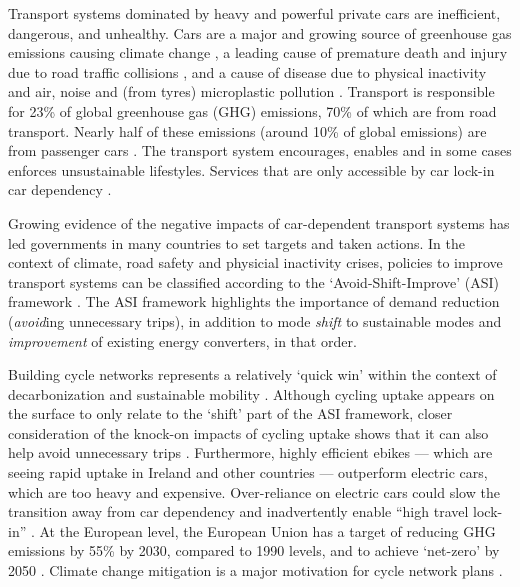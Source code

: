 \documentclass[
  super,
  preprint,
  3p]{elsarticle}
\begin{document}
Transport systems dominated by heavy and powerful private cars are
inefficient, dangerous, and unhealthy. Cars are a major and growing
source of greenhouse gas emissions causing climate change
\citep{winkler2023}, a leading cause of premature death and injury due
to road traffic collisions \citep{globals2018} , and a cause of disease
due to physical inactivity and air, noise and (from tyres) microplastic
pollution \citep{mattsson2023} \citep{welch2023} \citep{cavallaro2024}.
Transport is responsible for 23\% of global greenhouse gas (GHG)
emissions, 70\% of which are from road transport. Nearly half of these
emissions (around 10\% of global emissions) are from passenger cars
\citep{jaramillo2022}. The transport system encourages, enables and in
some cases enforces unsustainable lifestyles. Services that are only
accessible by car lock-in car dependency
\citep{gray2001, shergold2012, motte-baumvol2010}.

Growing evidence of the negative impacts of car-dependent transport
systems has led governments in many countries to set targets and taken
actions. In the context of climate, road safety and physicial inactivity
crises, policies to improve transport systems can be classified
according to the `Avoid-Shift-Improve' (ASI) framework
\citep{jaramillo2022}. The ASI framework highlights the importance of
demand reduction (\emph{avoid}ing unnecessary trips), in addition to
mode \emph{shift} to sustainable modes and \emph{improvement} of
existing energy converters, in that order.

Building cycle networks represents a relatively `quick win' within the
context of decarbonization \citep{brand2020} and sustainable mobility
\citep{burns2013}. Although cycling uptake appears on the surface to
only relate to the `shift' part of the ASI framework, closer
consideration of the knock-on impacts of cycling uptake shows that it
can also help avoid unnecessary trips \citep{nello-deakin2020}.
Furthermore, highly efficient ebikes --- which are seeing rapid uptake
in Ireland and other countries --- outperform electric cars, which are
too heavy and expensive. Over-reliance on electric cars could slow the
transition away from car dependency and inadvertently enable ``high
travel lock-in'' \citep{anable2019}. At the European level, the European
Union has a target of reducing GHG emissions by 55\% by 2030, compared
to 1990 levels, and to achieve `net-zero' by 2050 \citep{rosenow2022}.
Climate change mitigation is a major motivation for cycle network plans
\citep{scappini2022}.
\end{document}
